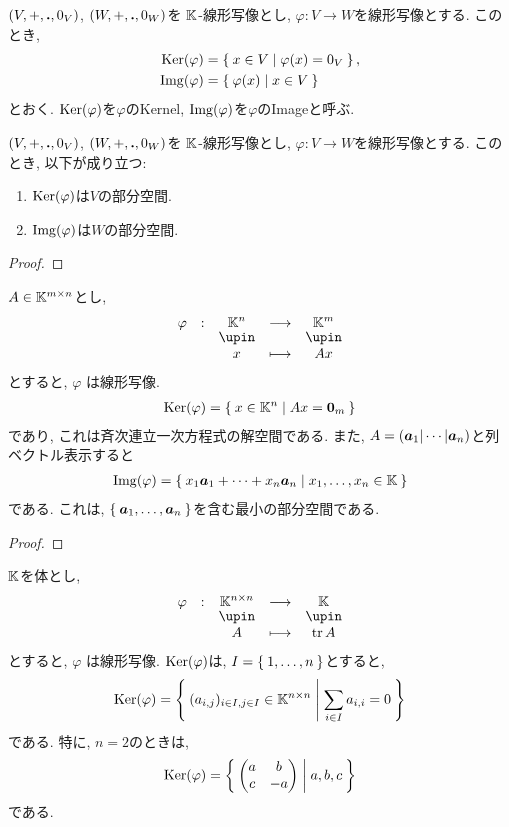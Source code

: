 \begin{definition}
  $(V,+,\mathbin{\boldsymbol{.}},0_V)$,
  $(W,+,\mathbin{\boldsymbol{.}},0_W)$を
  $\mathbb{K}$-線形写像とし,
  $\varphi\colon V\to W$を線形写像とする.
  このとき,
  \begin{align*}
    \operatorname{Ker}(\varphi)&=\Set{x\in V|\varphi(x)=0_V  },\\
    \operatorname{Img}(\varphi)&=\Set{\varphi(x)|x\in V}
  \end{align*}
  とおく. $\operatorname{Ker}(\varphi)$を$\varphi$のKernel,
  $\operatorname{Img}(\varphi)$を$\varphi$のImageと呼ぶ.
\end{definition}
\begin{prop}
  $(V,+,\mathbin{\boldsymbol{.}},0_V)$,
  $(W,+,\mathbin{\boldsymbol{.}},0_W)$を
  $\mathbb{K}$-線形写像とし,
  $\varphi\colon V\to W$を線形写像とする.
このとき, 以下が成り立つ:
\begin{enumerate}
  \item $\operatorname{Ker}(\varphi)$は$V$の部分空間.
  \item $\operatorname{Img}(\varphi)$は$W$の部分空間.
\end{enumerate}
\end{prop}
\begin{proof}\end{proof}

\begin{example}
  $A\in \mathbb{K}^{m\times n}$とし,
  \begin{align*}
    \shazo{\varphi}{\KK^{n}}{\KK^{m}}
    {x}{Ax}
  \end{align*}
  とすると, $\varphi$
  は線形写像.
  \begin{align*}
    \operatorname{Ker}(\varphi)=\Set{x\in\mathbb{K}^n|Ax=\boldsymbol{0}_m}
  \end{align*}
  であり, これは斉次連立一次方程式の解空間である.
  また, $A=(\boldsymbol{a}_1|\cdots|\boldsymbol{a}_n)$と列ベクトル表示すると
  \begin{align*}
    \operatorname{Img}(\varphi)=\Set{x_1\boldsymbol{a}_1+\cdots+x_n\boldsymbol{a}_n|x_1,\ldots,x_n\in \mathbb{K}}
  \end{align*}
  である. これは, $\Set{\boldsymbol{a}_1,\ldots,\boldsymbol{a}_n}$を含む最小の部分空間である.
\end{example}
\begin{proof}\end{proof}

\begin{example}
$\mathbb{K}$を体とし,  
  \begin{align*}
    \shazo{\varphi}{\KK^{n\times n}}{\KK}
    {A}{\tr A}
  \end{align*}
  とすると, $\varphi$
  は線形写像.
  $\operatorname{Ker}(\varphi)$は, $I=\Set{1,\dots,n}$とすると,
  \begin{align*}
    \operatorname{Ker}(\varphi)=
    \Set{(a_{i,j})_{i\in I,j\in I} \in\mathbb{K}^{n\times n}|\sum_{i\in I}a_{i,i}=0}
  \end{align*}
  である. 特に, $n=2$のときは,
  \begin{align*}
    \operatorname{Ker}(\varphi)=
    \Set{\begin{pmatrix}a&b\\c&-a\end{pmatrix}|a,b,c}
  \end{align*}
  である.
\end{example}

